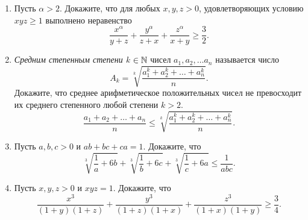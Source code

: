 \documentclass[a4paper,12pt,leqno]{article}
\begin{document}
\begin{enumerate}
		\item[\z] Пусть $\alpha > 2$. Докажите, что для любых $x, y, z > 0$, удовлетворяющих условию $xyz \geqslant 1$ выполнено неравенство
		$$\frac{x^\alpha}{y+z} + \frac{y^\alpha}{z+x} + \frac{z^\alpha}{x+y} \geqslant \frac{3}{2}.$$

		\item[\z] \textit{Средним степенным степени k} $\in \mathbb{N}$ чисел $a_1, a_2, \dots a_n$ 
		называется число $$A_k = \sqrt[k]{\frac{a_1^k + a_2^k + \dots + a_n^k}{n}}.$$ 
		Докажите, что среднее арифметическое положительных чисел не превосходит их среднего степенного любой степени $k > 2$.
		$$\frac{a_1+a_2 + \dots + a_n}{n} \leqslant \sqrt[k]{\frac{a_1^k +a_2^k + \dots + a_n^k}{n}}.$$

		\item[\z] Пусть $a, b, c > 0$ и $ab + bc + ca = 1$. Докажите, что 
		$$\sqrt[3]{\frac{1}{a} + 6b} + \sqrt[3]{\frac{1}{b} + 6c} + \sqrt[3]{\frac{1}{c} +6a} \leqslant \frac{1}{abc}.$$ 

		\item[\z] Пусть $x, y, z > 0$ и $xyz = 1$. Докажите, что 
		$$\frac{x^3}{(1+y)(1+z)} + \frac{y^3}{(1+z)(1+x)} + \frac{z^3}{(1+x)(1+y)} \geqslant \frac{3}{4}.$$

	\end{enumerate}
	
\end{document}
